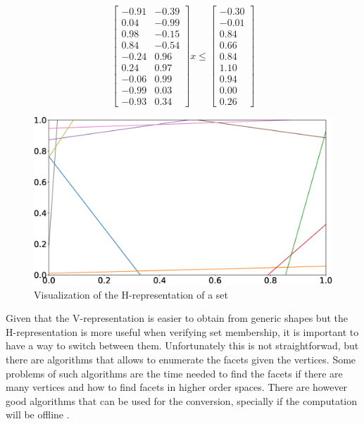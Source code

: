 \begin{equation}
	\label{eq:h-rep-example}
	\begin{bmatrix}
		-0.91 & -0.39 \\
		0.04  & -0.99 \\
		0.98  & -0.15 \\
		0.84  & -0.54 \\
		-0.24 & 0.96  \\
		0.24  & 0.97  \\
		-0.06 & 0.99  \\
		-0.99 & 0.03  \\
		-0.93 & 0.34
	\end{bmatrix}x \leq
	\begin{bmatrix}
		-0.30 \\
		-0.01 \\
		0.84  \\
		0.66  \\
		0.84  \\
		1.10  \\
		0.94  \\
		0.00  \\
		0.26
	\end{bmatrix}
\end{equation}

\begin{figure}[!htb]
	\centering
	\includegraphics[width=\linewidth]{imgs/h-rep}
	\caption{Visualization of the H-representation of a set}%
	\label{fig:h-rep-example}
\end{figure}

Given that the V-representation is easier to obtain from generic shapes but the
H-representation is more useful when verifying set membership, it is important
to have a way to switch between them. Unfortunately this is not straightforwad,
but there are algorithms that allows to enumerate the facets given the vertices.
Some problems of such algorithms are the time needed to find the facets if there
are many vertices and how to find facets in higher order spaces. There are
however good algorithms that can be used for the conversion, specially if the
computation will be offline
\parencite{avis.bremner.ea:how,graham.frances-yao:finding,lee:on,mccallum.avis:linear}.

